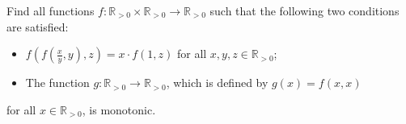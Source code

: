 Find all functions $f\colon\mathbb{R}_{>0} \times \mathbb{R}_{>0} \to \mathbb{R}_{>0}$ such that
the following two conditions are satisfied:
\begin{itemize}
    \item $f\left(f\left( \frac{x}{y},y\right),z\right)=x \cdot f(1,z)$ for all $x,y,z \in \mathbb{R}_{>0}$;
    \item The function $g:\mathbb{R}_{>0} \to \mathbb{R}_{>0}$, which is defined by $g(x)=f(x,x)$
\end{itemize}
for all $x \in \mathbb{R}_{>0}$, is monotonic.
